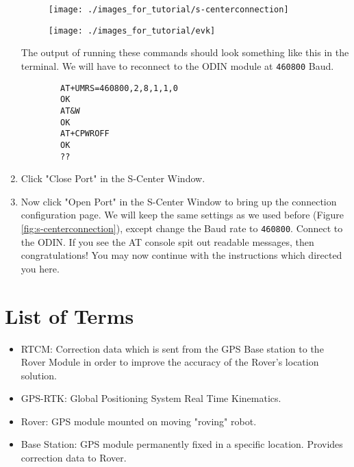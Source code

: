 \documentclass{article}%
\begin{document}
\begin{appendices}
\begin{enumerate}
		
			\begin{figure}
			\centering
			\begin{minipage}{.5\textwidth}
			  \centering
			  \texttt{[image: ./images\_for\_tutorial/s-centerconnection]}
			  \label{fig:s-centerconnection}
			\end{minipage}%
			\begin{minipage}{.5\textwidth}
			  \centering
			  \texttt{[image: ./images\_for\_tutorial/evk]}
			  \label{fig:evk}
			\end{minipage}
			\end{figure}
		
		The output of running these commands should look something like this in the terminal. We will have to reconnect to the ODIN module at \texttt{460800} Baud.
		\begin{lstlisting}
		AT+UMRS=460800,2,8,1,1,0
		OK
		AT&W
		OK
		AT+CPWROFF
		OK
		??
		\end{lstlisting}
	
		\item Click "Close Port" in the S-Center Window.
		\item Now click "Open Port" in the S-Center Window to bring up the connection configuration page.  We will keep the same settings as we used before (Figure \ref{fig:s-centerconnection}), except change the Baud rate to \texttt{460800}.  Connect to the ODIN.  If you see the AT console spit out readable messages, then congratulations! You may now continue with the instructions which directed you here.
	
	\end{enumerate}
	
	\section{List of Terms}

\begin{itemize}
	\item RTCM: Correction data which is sent from the GPS Base station to the Rover Module in order to improve the accuracy of the Rover's location solution.
	\item GPS-RTK: Global Positioning System Real Time Kinematics.
	\item Rover: GPS module mounted on moving "roving" robot.
	\item Base Station: GPS module permanently fixed in a specific location.  Provides correction data to Rover.
\end{itemize}

\end{appendices}
\end{document}
